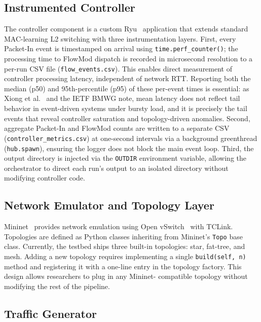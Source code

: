 \documentclass[conference]{IEEEtran}
\begin{document}
\subsection{Instrumented Controller}

The controller component is a custom Ryu~\cite{RyuFramework}
application that extends standard MAC-learning L2 switching
with three instrumentation layers. First, every Packet-In
event is timestamped on arrival using \texttt{time.perf\_counter()};
the processing time to FlowMod dispatch is recorded in
microsecond resolution to a per-run CSV file (\texttt{flow\_events.csv}).
This enables direct measurement of controller processing latency,
independent of network RTT. Reporting both the median (p50) and
95th-percentile (p95) of these per-event times is essential:
as Xiong et al.~\cite{Xiong2016QueueingSDN} and the IETF BMWG
note, mean latency does not reflect tail behavior in event-driven
systems under bursty load, and it is precisely the tail events
that reveal controller saturation and topology-driven anomalies.
Second, aggregate Packet-In and
FlowMod counts are written to a separate CSV
(\texttt{controller\_metrics.csv}) at one-second intervals via
a background greenthread (\texttt{hub.spawn}), ensuring the
logger does not block the main event loop. Third, the output
directory is injected via the \texttt{OUTDIR} environment
variable, allowing the orchestrator to direct each run's output
to an isolated directory without modifying controller code.

\subsection{Network Emulator and Topology Layer}

Mininet~\cite{Lantz2010Mininet} provides network emulation
using Open vSwitch~\cite{ovs} with TCLink. Topologies are
defined as Python classes inheriting from Mininet's \texttt{Topo}
base class. Currently, the testbed ships three built-in
topologies: star, fat-tree, and mesh. Adding a new topology
requires implementing a single \texttt{build(self, n)} method
and registering it with a one-line entry in the topology
factory. This design allows researchers to plug in any Mininet-
compatible topology without modifying the rest of the pipeline.

\subsection{Traffic Generator}
\end{document}
